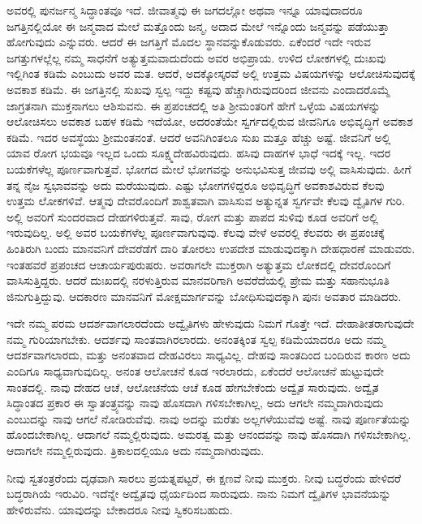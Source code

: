 ಅವರಲ್ಲಿ ಪುನರ್ಜನ್ಮ ಸಿದ್ಧಾಂತವೂ ಇದೆ. ಜೀವಾತ್ಮವು ಈ ಜಗದಲ್ಲೋ ಅಥವಾ ಇನ್ನೂ ಯಾವುದಾದರೂ ಜಗತ್ತಿನಲ್ಲಿಯೋ ಈ ಜನ್ಮವಾದ ಮೇಲೆ ಮತ್ತೊಂದು ಜನ್ಮ, ಅದಾದ ಮೇಲೆ ಇನ್ನೊಂದು ಜನ್ಮವನ್ನು ಪಡೆಯುತ್ತಾ ಹೋಗುವುದು ಎನ್ನುವರು. ಆದರೆ ಈ ಜಗತ್ತಿಗೆ ಮೊದಲ ಸ್ಥಾನವನ್ನುಕೊಡುವರು. ಏಕೆಂದರೆ ಇದೇ ಇರುವ ಜಗತ್ತುಗಳಲ್ಲೆಲ್ಲ ನಮ್ಮ ಸಾಧನೆಗೆ ಅತ್ಯುತ್ತಮವಾದುದೆಂದು ಅವರ ಅಭಿಪ್ರಾಯ. ಉಳಿದ ಲೋಕಗಳಲ್ಲಿ ದುಃಖವು ಇಲ್ಲಿಗಿಂತ ಕಡಿಮೆ ಎಂಬುದು ಅವರ ಮತ. ಆದರೆ, ಅದಕ್ಕೋಸ್ಕರವೆ ಅಲ್ಲಿ ಉತ್ತಮ ವಿಷಯಗಳನ್ನು ಆಲೋಚಿಸುವುದಕ್ಕೆ ಅವಕಾಶ ಕಡಿಮೆ. ಈ ಜಗತ್ತಿನಲ್ಲಿ ಸುಖವು ಸ್ವಲ್ಪ ಇದ್ದು ಕಷ್ಟವು ಹೆಚ್ಚಾಗಿರುವುದರಿಂದ ಜೀವನು ಎಂದಾದರೊಮ್ಮೆ ಜಾಗ್ರತನಾಗಿ ಮುಕ್ತನಾಗಲು ಆಶಿಸುವನು. ಈ ಪ್ರಪಂಚದಲ್ಲಿ ಅತಿ ಶ‍್ರೀಮಂತರಿಗೆ ಹೇಗೆ ಒಳ್ಳೆಯ ವಿಷಯಗಳನ್ನು ಆಲೋಚಿಸಲು ಅವಕಾಶ ಬಹಳ ಕಡಿಮೆ ಇದೆಯೋ, ಅದರಂತೆಯೇ ಸ್ವರ್ಗದಲ್ಲಿರುವ ಜೀವನಿಗೂ ಅಭಿವೃದ್ಧಿಗೆ ಅವಕಾಶ ಕಡಿಮೆ. ಇದರ ಅವಸ್ಥೆಯು ಶ‍್ರೀಮಂತನಂತೆ. ಆದರೆ ಅವನಿಗಿಂತಲೂ ಸುಖ ಮತ್ತೂ ಹೆಚ್ಚು ಅಷ್ಟೆ. ಜೀವನಿಗೆ ಅಲ್ಲಿ ಯಾವ ರೋಗ ಭಯವೂ ಇಲ್ಲದ ಒಂದು ಸೂಕ್ಷ್ಮದೇಹವಿರುವುದು. ಹಸಿವು ದಾಹಗಳ ಭಾಧೆ ಇದಕ್ಕೆ ಇಲ್ಲ. ಇದರ ಬಯಕೆಗಳೆಲ್ಲ ಪೂರ್ಣವಾಗುತ್ತವೆ. ಭೋಗದ ಮೇಲೆ ಭೋಗವನ್ನು ಅನುಭವಿಸುತ್ತ ಜೀವವು ಅಲ್ಲಿ ವಾಸಿಸುವುದು. ಹೀಗೆ ತನ್ನ ನೈಜ ಸ್ವಭಾವವನ್ನು ಅದು ಮರೆಯುವುದು. ಎಷ್ಟು ಭೋಗಗಳಿದ್ದರೂ ಅಭಿವೃದ್ಧಿಗೆ ಅವಕಾಶವಿರುವ ಕೆಲವು ಉತ್ತಮ ಲೋಕಗಳಿವೆ. ಆತ್ಮವು ದೇವರೊಂದಿಗೆ ಶಾಶ್ವತವಾಗಿ ವಾಸಿಸುವ ಅತ್ಯುನ್ನತ ಸ್ವರ್ಗವೇ ಕೆಲವು ದ್ವೈತಿಗಳ ಗುರಿ. ಅಲ್ಲಿ ಅವರಿಗೆ ಸುಂದರವಾದ ದೇಹಗಳಿರುತ್ತವೆ. ಸಾವು, ರೋಗ ಮತ್ತು ಪಾಪದ ಸುಳಿವು ಕೂಡ ಅವರಿಗೆ ಅಲ್ಲಿ ಇರುವುದಿಲ್ಲ. ಅಲ್ಲಿ ಅವರ ಬಯಕೆಗಳೆಲ್ಲ ಪೂರ್ಣವಾಗುವುವು. ಕೆಲವು ವೇಳೆ ಅವರಲ್ಲಿ ಕೆಲವರು ಈ ಪ್ರಪಂಚಕ್ಕೆ ಹಿಂತಿರುಗಿ ಬಂದು ಮಾನವನಿಗೆ ದೇವರೆಡೆಗೆ ದಾರಿ ತೋರಲು ಉಪದೇಶ ಮಾಡುವುದಕ್ಕಾಗಿ ದೇಹಧಾರಣೆ ಮಾಡುವರು. ಇಂತಹವರೆ ಪ್ರಪಂಚದ ಆಚಾರ್ಯಪುರುಷರು. ಅವರಾಗಲೇ ಮುಕ್ತರಾಗಿ ಅತ್ಯುತ್ತಮ ಲೋಕದಲ್ಲಿ ದೇವರೊಂದಿಗೆ ವಾಸಿಸುತ್ತಿದ್ದರು. ಆದರೆ ದುಃಖದಲ್ಲಿ ನರಳುತ್ತಿರುವ ಮಾನವರಿಗಾಗಿ ಅವರೆದೆಯಲ್ಲಿ ಪ್ರೇಮ ಮತ್ತು ಸಹಾನುಭೂತಿ ಜಿನುಗುತ್ತಿದ್ದುವು. ಆದಕಾರಣ ಮಾನವನಿಗೆ ಮೋಕ್ಷಮಾರ್ಗವನ್ನು ಬೋಧಿಸುವುದಕ್ಕಾಗಿ ಪುನಃ ಅವತಾರ ಮಾಡಿದರು. 

\vskip 0.2cm


ಇದೇ ನಮ್ಮ ಪರಮ ಆದರ್ಶವಾಗಲಾರದೆಂದು ಅದ್ವೈತಿಗಳು ಹೇಳುವುದು ನಿಮಗೆ ಗೊತ್ತೇ ಇದೆ. ದೇಹಾತೀತರಾಗುವುದೇ ನಮ್ಮ ಗುರಿಯಾಗಬೇಕು. ಆದರ್ಶವು ಸಾಂತವಾಗಿರಲಾರದು. ಅನಂತಕ್ಕಿಂತ ಸ್ವಲ್ಪ ಕಡಿಮೆಯಾದರೂ ಅದು ನಮ್ಮ ಆದರ್ಶವಾಗಲಾರದು, ಮತ್ತು ಅನಂತವಾದ ದೇಹವಿರಲು ಸಾಧ್ಯವಿಲ್ಲ. ದೇಹವು ಸಾಂತದಿಂದ ಬಂದಿರುವ ಕಾರಣ ಅದು ಎಂದಿಗೂ ಸಾಧ್ಯವಾಗುವುದಿಲ್ಲ. ಅನಂತ ಆಲೋಚನೆ ಕೂಡ ಇರಲಾರದು, ಏಕೆಂದರೆ ಆಲೋಚನೆ ಹುಟ್ಟುವುದೇ ಸಾಂತದಲ್ಲಿ. ನಾವು ದೇಹದ ಆಚೆ, ಆಲೋಚನೆಯ ಆಚೆ ಕೂಡ ಹೇಗಬೇಕೆಂದು ಅದ್ವೈತ ಸಾರುವುದು. ಅದ್ವೈತ ಸಿದ್ಧಾಂತದ ಪ್ರಕಾರ ಈ ಸ್ವಾತಂತ್ರ್ಯವನ್ನು ನಾವು ಹೊಸದಾಗಿ ಗಳಿಸಬೇಕಾಗಿಲ್ಲ, ಅದು ಆಗಲೇ ನಮ್ಮದಾಗಿರುವುದು ಎಂಬುದನ್ನು ನಾವು ಆಗಲೆ ನೋಡಿರುವೆವು. ನಾವು ಅದನ್ನು ಮರೆತು ಅಲ್ಲಗಳೆಯುವೆವು ಅಷ್ಟೆ. ನಾವು ಪೂರ್ಣತೆಯನ್ನು ಹೊಂದಬೇಕಾಗಿಲ್ಲ. ಆದಾಗಲೆ ನಮ್ಮಲ್ಲಿರುವುದು. ಅಮರತ್ವ ಮತ್ತು ಆನಂದವನ್ನು ನಾವು ಹೊಸದಾಗಿ ಗಳಿಸಬೇಕಾಗಿಲ್ಲ. ಆದಾಗಲೇ ನಮ್ಮಲ್ಲಿರುವುದು. ತ್ರಿಕಾಲದಲ್ಲಿಯೂ ಅದು ನಮ್ಮದಾಗಿರುವುದು. 


ನೀವು ಸ್ವತಂತ್ರರೆಂದು ದೃಢವಾಗಿ ಸಾರಲು ಪ್ರಯತ್ನಪಟ್ಟರೆ, ಈ ಕ್ಷಣವೆ ನೀವು ಮುಕ್ತರು. ನೀವು ಬದ್ಧರೆಂದು ಹೇಳಿದರೆ ಬದ್ಧರಾಗಿಯೆ ಇರುವಿರಿ. ಇದೆನ್ನೇ ಅದ್ವೈತವು ಧೈರ್ಯದಿಂದ ಸಾರುವುದು. ನಾನು ನಿಮಗೆ ದ್ವೈತಿಗಳ ಭಾವನೆಯನ್ನು ಹೇಳಿರುವೆನು. ಯಾವುದನ್ನು ಬೇಕಾದರೂ ನೀವು ಸ್ವಿಕರಿಸಬಹುದು. 

